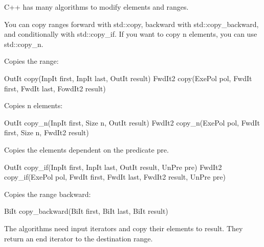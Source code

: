 
C++ has many algorithms to modify elements and ranges.


You can copy ranges forward with std::copy, backward with std::copy\_backward, and conditionally with std::copy\_if. If you want to copy n elements, you can use std::copy\_n.

Copies the range:

\begin{cpp}
OutIt copy(InpIt first, InpIt last, OutIt result)
FwdIt2 copy(ExePol pol, FwdIt first, FwdIt last, FowdIt2 result)
\end{cpp}

Copies n elements:

\begin{cpp}
OutIt copy_n(InpIt first, Size n, OutIt result)
FwdIt2 copy_n(ExePol pol, FwdIt first, Size n, FwdIt2 result)
\end{cpp}

Copies the elements dependent on the predicate pre.

\begin{cpp}
OutIt copy_if(InpIt first, InpIt last, OutIt result, UnPre pre)
FwdIt2 copy_if(ExePol pol, FwdIt first, FwdIt last, FwdIt2 result, UnPre pre)
\end{cpp}

Copies the range backward:

\begin{cpp}
BiIt copy_backward(BiIt first, BiIt last, BiIt result)
\end{cpp}

The algorithms need input iterators and copy their elements to result. They return an end iterator to the destination range.



